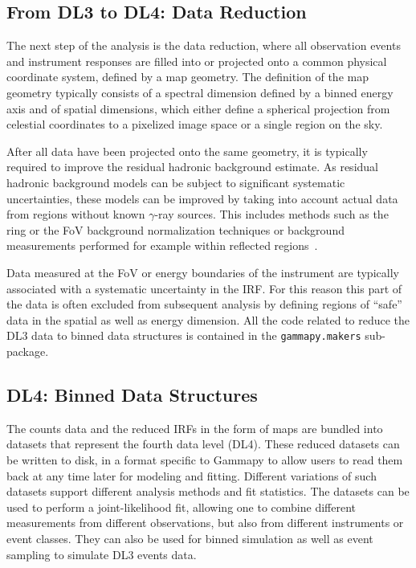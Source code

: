 \documentclass[longauth]{aa}
\newcommand{\code}[1]{\texttt{#1}}
\newcommand{\gammapy}{Gammapy\xspace}
\newcommand{\gammaray}{$\gamma$-ray\xspace}
\begin{document}
\subsection{From DL3 to DL4: Data Reduction}
The next step of the analysis is the data reduction, where all observation events and instrument
responses are filled into or projected onto a common physical coordinate system, defined by
a map geometry. The definition of the map geometry typically consists of a spectral dimension
defined by a binned energy axis and of spatial dimensions, which either define 
a spherical projection from celestial coordinates to a pixelized image space
or a single region on the sky.

After all data have been projected onto the same geometry, it is typically
required to improve the residual hadronic background estimate. As residual hadronic
background models can be subject to significant systematic uncertainties,
these models can be improved by taking into account actual data
from regions without known \gammaray sources. This includes methods 
such as the ring or the FoV background normalization techniques or background measurements
performed for example within reflected regions~\citep{Berge07}.


Data measured at the FoV or energy boundaries of the instrument are typically
associated with a systematic uncertainty in the IRF. For this reason this part 
of the data is often excluded from subsequent analysis by defining regions of
\enquote{safe} data in the spatial as well as energy dimension. All the code
related to reduce the DL3 data to binned data structures is contained in the
\code{gammapy.makers} sub-package.


\subsection{DL4: Binned Data Structures}
The counts data and the reduced IRFs in the form of maps are bundled into datasets
that represent the fourth data level (DL4). These reduced datasets can be written to disk,
in a format specific to \gammapy to allow users to read them back at any time later
for modeling and fitting. Different variations of such datasets support different 
analysis methods and fit statistics. The datasets can be used to perform a joint-likelihood
fit, allowing one to combine different measurements from different observations,
but also from different instruments or event classes. They can also be used for binned
simulation as well as event sampling to simulate DL3 events data.
\end{document}
